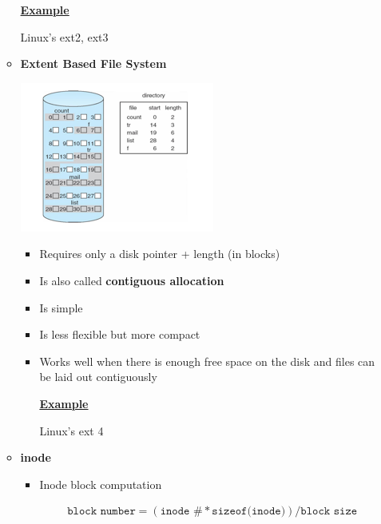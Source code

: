 \documentclass[12pt]{article}
\begin{document}
\begin{enumerate}[1.]
\begin{itemize}
        \bigskip

        \underline{\textbf{Example}}

        \bigskip

        Linux's ext2, ext3

        \item \textbf{Extent Based File System}

        \begin{center}
        \includegraphics[width=0.7\linewidth]{../images/midterm_4_solution_28.png}
        \end{center}

        \begin{itemize}
            \item Requires only a disk pointer + length (in blocks)
            \item Is also called \textbf{contiguous allocation}
            \item Is simple
            \item Is less flexible but more compact
            \item Works well when there is enough free space on the disk and files can be laid out contiguously

            \bigskip

            \underline{\textbf{Example}}

            \bigskip

            Linux's ext 4
        \end{itemize}
        \item \textbf{inode}
        \begin{itemize}
            \item Inode block computation

            \begin{align}
            \texttt{block number} = (\texttt{inode \#} * \texttt{sizeof(inode)}) / \texttt{block size}
            \end{align}


\end{itemize}
\end{itemize}
\end{enumerate}
\end{document}
